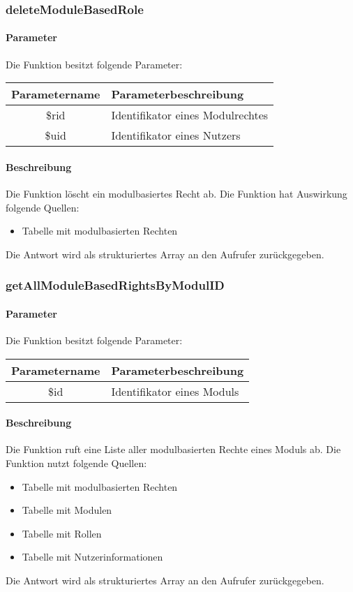 \subsubsection{deleteModuleBasedRole}
\paragraph{Parameter} Die Funktion besitzt folgende Parameter:
\begin{table}[H]
	\begin{tabular}{|c|p{11cm}|}
		\hline
		\textbf{Parametername} & \textbf{Parameterbeschreibung} \\ \hline
		\$rid & Identifikator eines Modulrechtes \\ \hline
		\$uid & Identifikator eines Nutzers \\ \hline
	\end{tabular}
\end{table}
\paragraph{Beschreibung} Die Funktion löscht ein modulbasiertes Recht ab. Die Funktion hat Auswirkung folgende Quellen:
\begin{itemize}
	\item Tabelle mit modulbasierten Rechten
\end{itemize}
Die Antwort wird als strukturiertes Array an den Aufrufer zurückgegeben.
\subsubsection{getAllModuleBasedRightsByModulID}
\paragraph{Parameter} Die Funktion besitzt folgende Parameter:
\begin{table}[H]
	\begin{tabular}{|c|p{11cm}|}
		\hline
		\textbf{Parametername} & \textbf{Parameterbeschreibung} \\ \hline
		\$id & Identifikator eines Moduls \\ \hline
	\end{tabular}
\end{table}
\paragraph{Beschreibung} Die Funktion ruft eine Liste aller modulbasierten Rechte eines Moduls ab. Die Funktion nutzt folgende Quellen:
\begin{itemize}
	\item Tabelle mit modulbasierten Rechten
	\item Tabelle mit Modulen
	\item Tabelle mit Rollen
	\item Tabelle mit Nutzerinformationen
\end{itemize}
Die Antwort wird als strukturiertes Array an den Aufrufer zurückgegeben.
